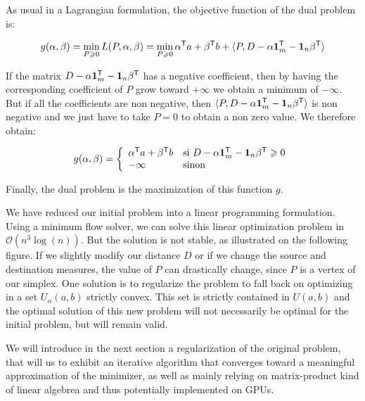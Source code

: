 As usual in a Lagrangian formulation, the objective function of the dual
problem is:

$$ g(\alpha, \beta) = \min_{P \geqslant 0} L(P, \alpha, \beta) = \min_{P \geqslant 0} \alpha^{\mathsf{T}} a + \beta^{\mathsf{T}} b + \langle P, D - \alpha \mathbf{1}_m^{\mathsf{T}} - \mathbf{1}_n \beta^{\mathsf{T}} \rangle $$

If the matrix $D - \alpha \mathbf{1}_m^{\mathsf{T}} - \mathbf{1}_n \beta^{\mathsf{T}}$
has a negative coefficient, then by having the corresponding coefficient
of $P$ grow toward $+\infty$ we obtain a minimum of $-\infty$. But
if all the coefficients are non negative, then  $\langle P, D - \alpha
\mathbf{1}_m^{\mathsf{T}} - \mathbf{1}_n \beta^{\mathsf{T}} \rangle$ is non negative
and we just have to take $P=0$ to obtain a non zero value. We therefore obtain:

$$ g(\alpha, \beta) = \left\{ \begin{array}{ll}
\alpha^{\mathsf{T}} a + \beta^{\mathsf{T}} b & \text{si } D - \alpha \mathbf{1}_m^{\mathsf{T}} - \mathbf{1}_n \beta^{\mathsf{T}} \geqslant 0 \\
-\infty & \text{sinon}
\end{array}\right. $$

Finally, the dual problem is the maximization of this function $g$.


We have reduced our initial problem into a linear programming
formulation. Using a minimum flow solver, we can solve this linear optimization
problem in $\mathcal{O}(n^3 \log (n))$. But the solution is not stable,
as illustrated on the following figure. If we slightly modify our distance
$D$ or if we change the source and destination measures, the value of $P$
can drastically change, since $P$ is a vertex of our simplex. One solution
is to regularize the problem to fall back on optimizing in a set $U_\alpha(a,
b)$ strictly convex. This set is strictly contained in $U(a, b)$ and the
optimal solution of this new problem will not necessarily be optimal for the
initial problem, but will remain valid.

We will introduce in the next section a regularization of the original
problem, that will us to exhibit an iterative algorithm that converges toward
a meaningful approximation of the minimizer, as well as mainly relying on
matrix-product kind of linear algebrea and thus potentially implemented
on GPUs.


